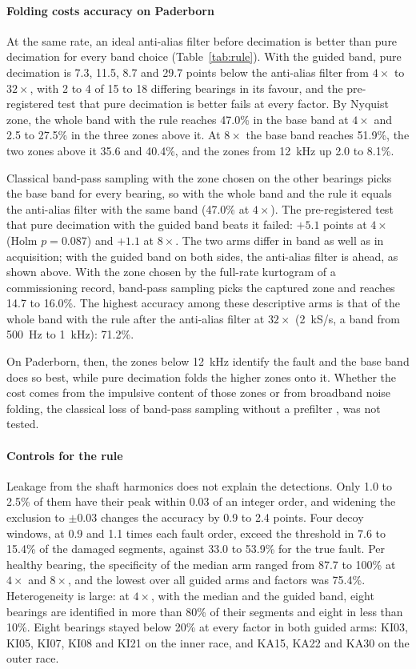 \paragraph{Folding costs accuracy on Paderborn} At the same rate, an ideal anti-alias filter
before decimation is better than pure decimation for every band choice (Table~\ref{tab:rule}). With
the guided band, pure decimation is 7.3, 11.5, 8.7 and 29.7 points below the anti-alias filter from
$4\times$ to $32\times$, with 2 to 4 of 15 to 18 differing bearings in its favour, and the
pre-registered test that pure decimation is better fails at every factor. By Nyquist zone, the
whole band with the rule reaches 47.0\% in the base band at $4\times$ and 2.5 to 27.5\% in the three
zones above it. At $8\times$ the base band reaches 51.9\%, the two zones above it 35.6 and 40.4\%,
and the zones from 12~kHz up 2.0 to 8.1\%.

Classical band-pass sampling with the zone chosen on the other bearings picks the base band for
every bearing, so with the whole band and the rule it equals the anti-alias filter with the same
band (47.0\% at $4\times$). The pre-registered test that pure decimation with the guided band beats
it failed: $+5.1$ points at $4\times$ (Holm $p = 0.087$) and $+1.1$ at $8\times$. The two arms
differ in band as well as in acquisition; with the guided band on both sides, the anti-alias filter
is ahead, as shown above. With the zone chosen by the full-rate kurtogram of a commissioning record,
band-pass sampling picks the captured zone and reaches 14.7 to 16.0\%. The highest accuracy among
these descriptive arms is that of the whole band with the rule after the anti-alias filter at
$32\times$ (2~kS/s, a band from 500~Hz to 1~kHz): 71.2\%.

On Paderborn, then, the zones below 12~kHz identify the fault and the base band does so best, while
pure decimation folds the higher zones onto it. Whether the cost comes from the impulsive content of
those zones or from broadband noise folding, the classical loss of band-pass sampling without a
prefilter \citep{vaughan1991,davenport2012noisefolding}, was not tested.

\paragraph{Controls for the rule} Leakage from the shaft harmonics does not explain the detections.
Only 1.0 to 2.5\% of them have their peak within 0.03 of an integer order, and widening the
exclusion to $\pm0.03$ changes the accuracy by 0.9 to 2.4 points. Four decoy windows, at 0.9 and
1.1 times each fault order, exceed the threshold in 7.6 to 15.4\% of the damaged segments, against
33.0 to 53.9\% for the true fault. Per healthy bearing, the specificity of the median arm ranged
from 87.7 to 100\% at $4\times$ and $8\times$, and the lowest over all guided arms and factors was
75.4\%. Heterogeneity is large: at $4\times$, with the median and the guided band, eight bearings
are identified in more than 80\% of their segments and eight in less than 10\%. Eight bearings
stayed below 20\% at every factor in both guided arms: KI03, KI05, KI07, KI08 and KI21 on the
inner race, and KA15, KA22 and KA30 on the outer race.

